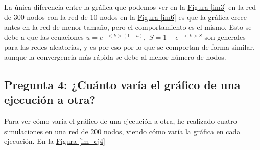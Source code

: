 \documentclass[paper=a4, fontsize=11pt]{article} %
\numberwithin{equation}{section} %
\numberwithin{figure}{section} %
\numberwithin{table}{section} %
\begin{document}
La única diferencia entre la gráfica que podemos ver en la \hyperref[im3]{Figura \ref{im3}} en la red de 300 nodos con la red de 10 nodos en la \hyperref[im6]{Figura \ref{im6}} es que la gráfica crece antes en la red de menor tamaño, pero el comportamiento es el mismo. Esto se debe a que las ecuaciones $u=e^{- <k>(1-u)},$ $S = 1-e^{-<k>S}$ son generales para las redes aleatorias, y es por eso por lo que se comportan de forma similar, aunque la convergencia más rápida se debe al menor número de nodos.

\subsection{Pregunta 4: ¿Cuánto varía el gráfico de una ejecución a otra?}

Para ver cómo varía el gráfico de una ejecución a otra, he realizado cuatro simulaciones en una red de 200 nodos, viendo cómo varía la gráfica en cada ejecución. En la \hyperref[im_ej4]{Figura \ref{im_ej4}}
\end{document}
